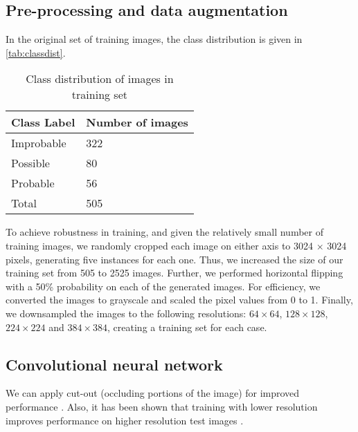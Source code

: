 \documentclass[Journal, letterpaper]{ascelike-new}
\newcommand{\?}{\stackrel{?}{=}}
\begin{document}
\subsection{Pre-processing and data augmentation}
In the original set of training images, the class distribution is given in \autoref{tab:classdist}.

\begin{table}[h!]\small
    \centering
    \begin{tabular}{l l}\toprule
    \bf Class Label     & \bf Number of images  \\ \midrule
    Improbable & 322\\
    Possible & 80 \\
    Probable & 56 \\\midrule
    Total & 505 \\\bottomrule
    \end{tabular}
    \caption{Class distribution of images in training set}
    \label{tab:classdist}
\end{table}

To achieve robustness in training, and given the relatively small number of training images, we randomly cropped each image on either axis to 3024 $\times$ 3024 pixels, generating five instances for each one. Thus, we increased the size of our training set from 505 to 2525 images. Further, we performed horizontal flipping with a 50\% probability on each of the generated images. For efficiency, we converted the images to grayscale and scaled the pixel values from 0 to 1. Finally, we downsampled the images to the following resolutions: $64 \times 64$, $128 \times 128$, $224 \times 224$ and $384\times 384$, creating a training set for each case. 

\subsection{Convolutional neural network}

We can apply cut-out (occluding portions of the image) for improved performance \cite{devries2017improved}. Also, it has been shown that training with lower resolution improves performance on higher resolution test images \cite{touvronfixing}.
\end{document}
